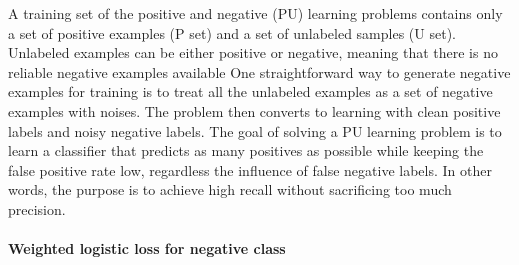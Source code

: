 A training set of the positive and negative (PU) learning problems contains only a set of positive examples (P set) and a set of unlabeled samples (U set).
Unlabeled examples can be either positive or negative, meaning that there is no reliable negative examples available
One straightforward way to generate negative examples for training is to treat all the unlabeled examples as a set of negative examples with noises.
The problem then converts to learning with clean positive labels and noisy negative labels.
The goal of solving a PU learning problem is to learn a classifier that predicts as many positives as possible while keeping the false positive rate low, regardless the influence of false negative labels.
In other words, the purpose is to achieve high recall without sacrificing too much precision.



\paragraph{Weighted logistic loss for negative class}

